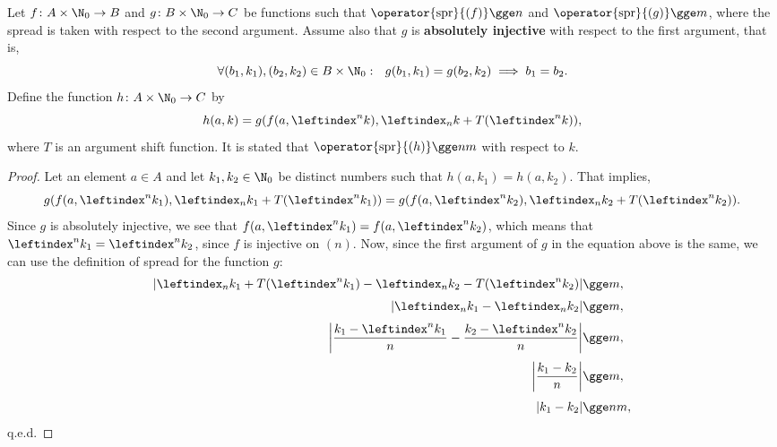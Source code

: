 \documentclass[12pt, a4paper]{article}
\newcommand{\spr}[1]{\operator{\mathrm{spr}}{\left(#1\right)}}
\newcommand{\lli}[1]{\leftindex_{#1}}
\newcommand{\lui}[1]{\leftindex^{#1}}
\begin{document}
\begin{proposition}\label{comp}
    Let $ f \colon A \times \N_0 \to B $ and $ g \colon B \times \N_0 \to C $ be functions such that $ \spr{f} \gge n $ and $ \spr{g} \gge m $, where the spread is taken with respect to the second argument. Assume also that $ g $ is \textbf{absolutely injective} with respect to the first argument, that is,
    \[ \forall (b_1, k_1), (b_2, k_2) \in B \times \N_0: \ \ g(b_1, k_1) = g(b_2, k_2) \implies b_1 = b_2. \] 
    Define the function $ h \colon A \times \N_0 \to C $ by
    \[ h(a, k) = g(f(a, \lui{n}k), \lli{n}k + T(\lui{n}k)), \]
    where $ T $ is an argument shift function. It is stated that $ \spr{h} \gge nm $ with respect to $ k $.
\end{proposition}
\begin{proof}
    Let an element $ a \in A $ and let $ k_1, k_2 \in \N_0 $ be distinct numbers such that $ h(a, k_1) = h(a, k_2) $. That implies,
    \[ g(f(a, \lui{n}k_1), \lli{n}k_1 + T(\lui{n}k_1)) = g(f(a, \lui{n}k_2), \lli{n}k_2 + T(\lui{n}k_2)). \]
    Since $ g $ is absolutely injective, we see that $ f(a, \lui{n}k_1) = f(a, \lui{n}k_2) $, which means that $ \lui{n}k_1 = \lui{n}k_2 $, since $ f $ is injective on $ (n) $. Now, since the first argument of $ g $ in the equation above is the same, we can use the definition of spread for the function $ g $:
    \begin{align*}
        |\lli{n}k_1 + T(\lui{n}k_1) - \lli{n}k_2 - T(\lui{n}k_2)| &\gge m,\\[1mm]
        | \lli{n}k_1 - \lli{n}k_2 | &\gge m,\\[1mm]
        \left| \frac{k_1 - \lui{n}k_1}{n} - \frac{k_2 - \lui{n}k_2}{n} \right| &\gge m,\\[1mm]
        \left| \frac{k_1 - k_2}{n} \right| &\gge m,\\[1mm]
        |k_1 - k_2| &\gge nm,
    \end{align*}
    q.e.d.
\end{proof}
\end{document}
